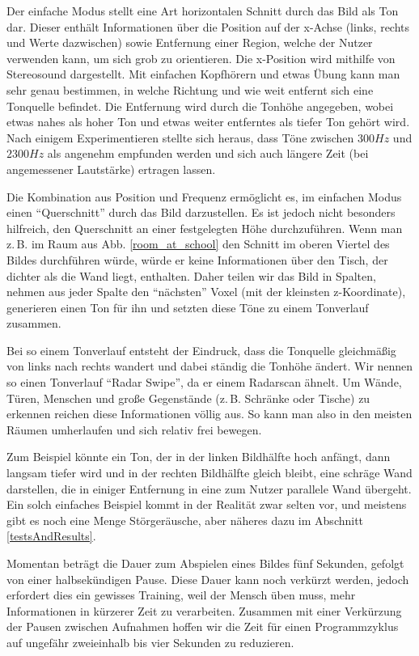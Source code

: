 \documentclass[a4paper,12pt,ngerman]{scrartcl}
\begin{document}
Der einfache Modus stellt eine Art horizontalen Schnitt durch das Bild als Ton dar. Dieser enthält Informationen
über die Position auf der x-Achse (links, rechts und Werte dazwischen) sowie Entfernung einer Region, welche der Nutzer verwenden kann,
um sich grob zu orientieren. Die x-Position wird mithilfe von Stereosound dargestellt. Mit einfachen Kopfhörern und etwas Übung
kann man sehr genau bestimmen, in welche Richtung und wie weit entfernt sich eine Tonquelle befindet. Die Entfernung wird
durch die Tonhöhe angegeben, wobei etwas nahes als hoher Ton und etwas weiter entferntes als tiefer Ton gehört wird.
Nach einigem Experimentieren stellte sich heraus, dass Töne zwischen $300 Hz$ und $2300 Hz$ als angenehm empfunden werden und sich
auch längere Zeit (bei angemessener Lautstärke) ertragen lassen. \par 
Die Kombination aus Position und Frequenz ermöglicht es, im
einfachen Modus einen \enquote{Querschnitt} durch das Bild darzustellen. Es ist jedoch nicht besonders hilfreich, 
den Querschnitt an einer festgelegten Höhe durchzuführen. Wenn man z.\,B. im Raum aus Abb. \ref{room_at_school} den Schnitt im oberen Viertel des Bildes durchführen würde, würde er keine Informationen über den Tisch, der dichter als
die Wand liegt, enthalten. Daher teilen wir das Bild in Spalten, nehmen aus jeder Spalte den \enquote{nächsten} Voxel 
(mit der kleinsten z-Koordinate), generieren einen Ton für ihn und setzten diese Töne zu einem Tonverlauf zusammen. \par
Bei so einem Tonverlauf entsteht der Eindruck, dass die Tonquelle gleichmäßig von links nach rechts wandert und dabei ständig
die Tonhöhe ändert. Wir nennen so einen Tonverlauf \enquote{Radar Swipe}, da er einem Radarscan ähnelt.
Um Wände, Türen, Menschen und große Gegenstände (z.\,B. Schränke oder Tische) zu erkennen reichen diese Informationen völlig aus. So kann man also in den meisten Räumen umherlaufen und sich relativ frei bewegen.\par
Zum Beispiel könnte ein Ton, der in der linken Bildhälfte hoch anfängt, dann langsam tiefer wird und 
in der rechten Bildhälfte gleich bleibt, eine schräge Wand darstellen, die in einiger Entfernung in eine
zum Nutzer parallele Wand übergeht. Ein solch einfaches Beispiel kommt in der Realität zwar selten vor, und meistens gibt es
noch eine Menge Störgeräusche, aber näheres dazu im Abschnitt \ref{testsAndResults}.\par 
Momentan beträgt die Dauer zum Abspielen eines Bildes fünf Sekunden, gefolgt von einer halbsekündigen Pause.
Diese Dauer kann noch verkürzt werden, jedoch erfordert dies ein gewisses 
Training, weil der Mensch üben muss, mehr Informationen in kürzerer Zeit zu verarbeiten. Zusammen mit 
einer Verkürzung der Pausen zwischen Aufnahmen hoffen wir die Zeit für einen Programmzyklus auf ungefähr
zweieinhalb bis vier Sekunden zu reduzieren.
\end{document}
